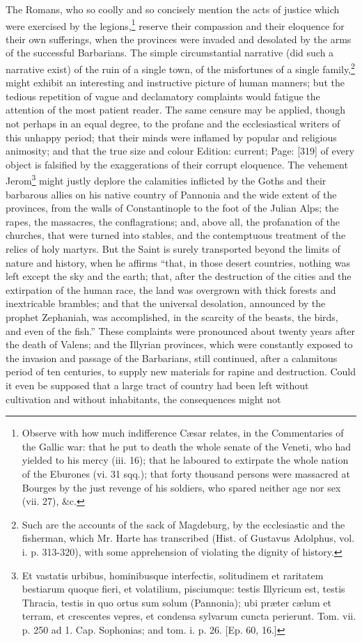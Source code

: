 The Romans, who so coolly and so concisely mention the acts of justice which were exercised by the legions,\footnote{Observe with how much indifference Cæsar relates, in the Commentaries of the Gallic war: that he put to death the whole senate of the Veneti, who had yielded to his mercy (iii. 16); that he laboured to extirpate the whole nation of the Eburones (vi. 31 sqq.); that forty thousand persons were massacred at Bourges by the just revenge of his soldiers, who spared neither age nor sex (vii. 27), \&c.} reserve their compassion and their eloquence for their own sufferings, when the provinces were invaded and desolated by the arms of the successful Barbarians. The simple circumstantial narrative (did such a narrative exist) of the ruin of a single town, of the misfortunes of a single family,\footnote{Such are the accounts of the sack of Magdeburg, by the ecclesiastic and the fisherman, which Mr. Harte has transcribed (Hist. of Gustavus Adolphus, vol. i. p. 313-320), with some apprehension of violating the dignity of history.} might exhibit an interesting and instructive picture of human manners; but the tedious repetition of vague and declamatory complaints would fatigue the attention of the most patient reader. The same censure may be applied, though not perhaps in an equal degree, to the profane and the ecclesiastical writers of this unhappy period; that their minds were inflamed by popular and religious animosity; and that the true size and colour Edition: current; Page: [319] of every object is falsified by the exaggerations of their corrupt eloquence. The vehement Jerom\footnote{Et vastatis urbibus, hominibusque interfectis, solitudinem et raritatem bestiarum quoque fieri, et volatilium, pisciumque: testis Illyricum est, testis Thracia, testis in quo ortus sum solum (Pannonia); ubi præter cælum et terram, et crescentes vepres, et condensa sylvarum cuncta perierunt. Tom. vii. p. 250 ad 1. Cap. Sophonias; and tom. i. p. 26. [Ep. 60, 16.]} might justly deplore the calamities inflicted by the Goths and their barbarous allies on his native country of Pannonia and the wide extent of the provinces, from the walls of Constantinople to the foot of the Julian Alps; the rapes, the massacres, the conflagrations; and, above all, the profanation of the churches, that were turned into stables, and the contemptuous treatment of the relics of holy martyrs. But the Saint is surely transported beyond the limits of nature and history, when he affirms \texthebrew{“}that, in those desert countries, nothing was left except the sky and the earth; that, after the destruction of the cities and the extirpation of the human race, the land was overgrown with thick forests and inextricable brambles; and that the universal desolation, announced by the prophet Zephaniah, was accomplished, in the scarcity of the beasts, the birds, and even of the fish.\texthebrew{}” These complaints were pronounced about twenty years after the death of Valens; and the Illyrian provinces, which were constantly exposed to the invasion and passage of the Barbarians, still continued, after a calamitous period of ten centuries, to supply new materials for rapine and destruction. Could it even be supposed that a large tract of country had been left without cultivation and without inhabitants, the consequences might not 